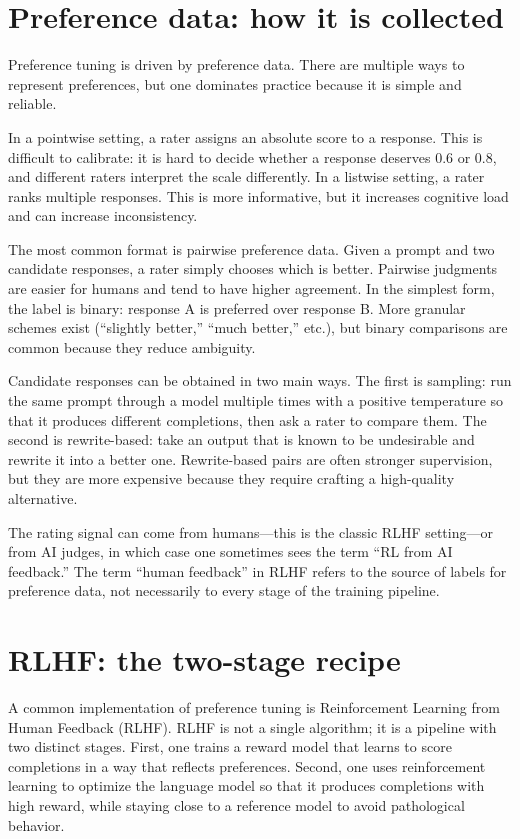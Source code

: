 \section{Preference data: how it is collected}
Preference tuning is driven by preference data. There are multiple ways to represent preferences, but one dominates practice because it is simple and reliable.

In a pointwise setting, a rater assigns an absolute score to a response. This is difficult to calibrate: it is hard to decide whether a response deserves 0.6 or 0.8, and different raters interpret the scale differently. In a listwise setting, a rater ranks multiple responses. This is more informative, but it increases cognitive load and can increase inconsistency.

The most common format is pairwise preference data. Given a prompt and two candidate responses, a rater simply chooses which is better. Pairwise judgments are easier for humans and tend to have higher agreement. In the simplest form, the label is binary: response A is preferred over response B. More granular schemes exist (“slightly better,” “much better,” etc.), but binary comparisons are common because they reduce ambiguity.

Candidate responses can be obtained in two main ways. The first is sampling: run the same prompt through a model multiple times with a positive temperature so that it produces different completions, then ask a rater to compare them. The second is rewrite-based: take an output that is known to be undesirable and rewrite it into a better one. Rewrite-based pairs are often stronger supervision, but they are more expensive because they require crafting a high-quality alternative.

The rating signal can come from humans—this is the classic RLHF setting—or from AI judges, in which case one sometimes sees the term “RL from AI feedback.” The term “human feedback” in RLHF refers to the source of labels for preference data, not necessarily to every stage of the training pipeline.

\section{RLHF: the two-stage recipe}
A common implementation of preference tuning is Reinforcement Learning from Human Feedback (RLHF). RLHF is not a single algorithm; it is a pipeline with two distinct stages. First, one trains a reward model that learns to score completions in a way that reflects preferences. Second, one uses reinforcement learning to optimize the language model so that it produces completions with high reward, while staying close to a reference model to avoid pathological behavior.

